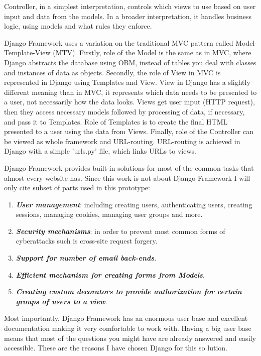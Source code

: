 Controller, in a simplest interpretation, controls which views to use based on user input and data from the models. In a broader interpretation, it handles business logic, using models and what rules they enforce.

Django Framework uses a variation on the traditional MVC pattern called Model-Template-View (MTV). Firstly, role of the Model is the same as in MVC, where Django abstracts the database using OBM, instead of tables you deal with classes and instances of data as objects. Secondly, the role of View in MVC is represented in Django using Templates and View. View in Django has a slightly different meaning than in MVC, it represents which data needs to be presented to a user, not necessarily how the data looks. Views get user input (HTTP request), then they access necessary models followed by processing of data, if necessary, and pass it to Templates. Role of Templates is to create the final HTML presented to a user using the data from Views. Finally, role of the Controller can be viewed as whole framework and URL-routing. URL-routing is achieved in Django with a simple 'urls.py' file, which links URLs to views.

Django Framework provides built-in solutions for most of the common tasks that almost every website has. Since this work is not about Django Framework I will only cite subset of parts used in this prototype:

\begin{enumerate}
	\setlength{\itemsep}{1pt}
	\item \textbf{\textit{User management}}: including creating users, authenticating users, creating sessions, managing cookies, managing user groups and more.
	\item \textbf{\textit{Security mechanisms}}: in order to prevent most common forms of cyberattacks such is cross-site request forgery.
	\item \textbf{\textit{Support for number of email back-ends}}.
	\item \textbf{\textit{Efficient mechanism for creating forms from Models}}.
	\item \textbf{\textit{Creating custom decorators to provide authorization for certain groups of users to a view}}.
\end{enumerate}

Most importantly, Django Framework has an enormous user base and excellent documentation making it very comfortable to work with. Having a big user base means that most of the questions you might have are already answered and easily accessible. These are the reasons I have chosen Django for this so lution.

